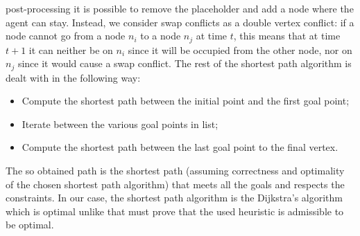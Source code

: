 post-processing it is possible to remove the placeholder and add a node where
the agent can stay. \newline
Instead, we consider swap conflicts as a double vertex conflict: if a node 
cannot go from a node $n_i$ to a node $n_j$ at time $t$, this means that at
time $t+1$ it can neither be on $n_i$ since it will be occupied from the other
node, nor on $n_j$ since it would cause a swap conflict. \newline
The rest of the shortest path algorithm is dealt with in the following way:
\begin{itemize}
  \item Compute the shortest path between the initial point and the first goal
    point; 
  \item Iterate between the various goal points in list;
  \item Compute the shortest path between the last goal point to the final
    vertex.
\end{itemize}
The so obtained path is the shortest path (assuming correctness and optimality
of the chosen shortest path algorithm) that meets all the goals and respects
the constraints. In our case, the shortest path algorithm is the Dijkstra's 
algorithm which is optimal unlike \astar that must prove that the used
heuristic is admissible to be optimal.
%
%
